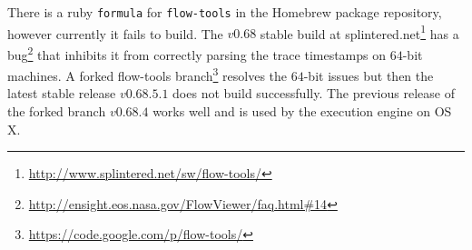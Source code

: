 There is a ruby \texttt{formula} for \texttt{flow-tools} in the Homebrew
package repository, however currently it fails to build. The $v0.68$ stable
build at
splintered.net\footnote{\url{http://www.splintered.net/sw/flow-tools/}} has a
bug\footnote{\url{http://ensight.eos.nasa.gov/FlowViewer/faq.html#14}} that
inhibits it from correctly parsing the trace timestamps  on $64$-bit machines. A forked flow-tools
branch\footnote{\url{https://code.google.com/p/flow-tools/}} resolves the
$64$-bit issues but then the latest stable release $v0.68.5.1$ does not build
successfully. The previous release of the forked branch $v0.68.4$ works well
and is used by the execution engine on OS X.


